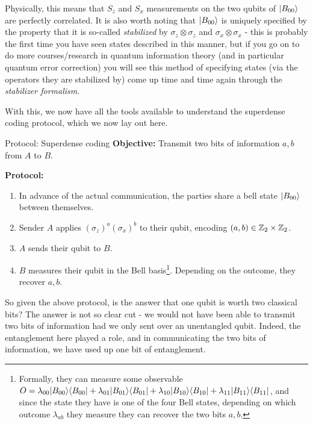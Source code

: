 Physically, this means that $S_z$ and $S_x$ measurements on the two qubits of $\lvert B_{00} \rangle$ are perfectly correlated. It is also worth noting that $\lvert B_{00} \rangle$ is uniquely specified by the property that it is so-called \emph{stabilized} by  $\sigma_z \otimes \sigma_z$ and $\sigma_x \otimes \sigma_x$ - this is probably the first time you have seen states described in this manner, but if you go on to do more courses/research in quantum information theory (and in particular quantum error correction) you will see this method of specifying states (via the operators they are stabilized by) come up time and time again through the \emph{stabilizer formalism}.


With this, we now have all the tools available to understand the superdense coding protocol, which we now lay out here.

\begin{blankbox}{Protocol: Superdense coding}
    \textbf{Objective:} Transmit two bits of information $a, b$ from $A$ to $B$. 

    \noindent
    \textbf{Protocol:}
    \begin{enumerate}
        \item In advance of the actual communication, the parties share a bell state $\lvert B_{00} \rangle$ between themselves.
        \item Sender $A$ applies $(\sigma_z)^a(\sigma_x)^b$ to their qubit, encoding $(a, b) \in \mathbb{Z}_2 \times \mathbb{Z}_2$. 
        \item $A$ sends their qubit to $B$.
        \item $B$ measures their qubit in the Bell basis\footnote{Formally, they can measure some observable $O = \lambda_{00}\lvert B_{00} \rangle \langle B_{00} \rvert + \lambda_{01}\lvert B_{01} \rangle \langle B_{01} \rvert + \lambda_{10}\lvert B_{10} \rangle \langle B_{10} \rvert + \lambda_{11}\lvert B_{11} \rangle \langle B_{11} \rvert$, and since the state they have is one of the four Bell states, depending on which outcome $\lambda_{ab}$ they measure they can recover the two bits $a, b$.}. Depending on the outcome, they recover $a ,b$.
    \end{enumerate}
\end{blankbox}

So given the above protocol, is the answer that one qubit is worth two classical bits? The answer is not so clear cut - we would not have been able to transmit two bits of information had we only sent over an unentangled qubit. Indeed, the entanglement here played a role, and in communicating the two bits of information, we have used up one bit of entanglement.

